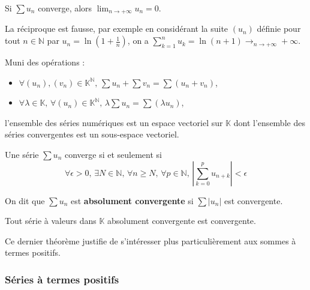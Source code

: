 	
	\begin{proposition}
		Si $\sum u_n$ converge, alors $\lim_{n \rightarrow +\infty} u_n = 0$.
	\end{proposition}
	
	\begin{cexample}
		La réciproque est fausse, par exemple en considérant la suite $(u_n)$ définie pour tout $n \in \mathbb{N}$ par $u_n = \ln(1 + \frac{1}{n})$, on a $\sum_{k=1}^{n} u_k = \ln(n+1) \longrightarrow_{n \rightarrow +\infty} +\infty$.
	\end{cexample}
	
	\begin{proposition}
		Muni des opérations :
		\begin{itemize}
			\item $\forall (u_n), (v_n) \in \mathbb{K}^{\mathbb{N}}, \, \sum u_n + \sum v_n = \sum (u_n + v_n)$,
			\item $\forall \lambda \in \mathbb{K}, \, \forall (u_n) \in \mathbb{K}^{\mathbb{N}}, \, \lambda \sum u_n = \sum (\lambda u_n)$,
		\end{itemize}
		l'ensemble des séries numériques est un espace vectoriel sur $\mathbb{K}$ dont l'ensemble des séries convergentes est un sous-espace vectoriel.
	\end{proposition}
	
	
	\begin{proposition}
		Une série $\sum u_n$ converge si et seulement si
		\[ \forall \epsilon > 0, \, \exists N \in \mathbb{N}, \, \forall n \geq N, \, \forall p \in \mathbb{N}, \, \left| \sum_{k=0}^{p} u_{n+k} \right| < \epsilon \]
	\end{proposition}
	
	\begin{definition}
		On dit que $\sum u_n$ est \textbf{absolument convergente} si $\sum |u_n|$ est convergente.
	\end{definition}
	
	\begin{theorem}
		Tout série à valeurs dans $\mathbb{K}$ absolument convergente est convergente.
	\end{theorem}
	
	Ce dernier théorème justifie de s'intéresser plus particulièrement aux sommes à termes positifs.
	
	\subsubsection{Séries à termes positifs}
	
